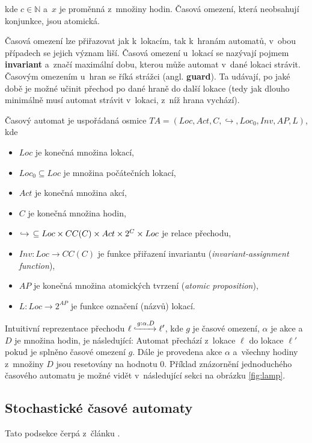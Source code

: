 kde $c \in \mathbb{N}$ a~$x$ je proměnná z~množiny hodin. Časová omezení, která neobsahují konjunkce, jsou atomická.

Časová omezení lze přiřazovat jak k~lokacím, tak k~hranám automatů, v~obou případech se jejich význam liší. Časová omezení u~lokací se nazývají pojmem \textbf{invariant} a~značí maximální dobu, kterou může automat v~dané lokaci strávit. Časovým omezením u~hran se říká strážci (angl. \textbf{guard}). Ta udávají, po jaké době je možné učinit přechod po dané hraně do další lokace (tedy jak dlouho minimálně musí automat strávit v~lokaci, z~níž hrana vychází).

\bigskip

Časový automat je uspořádaná osmice $TA = (Loc, Act, C, \hookrightarrow, Loc_0, Inv, AP, L)$, kde

\begin{itemize}
    \item $Loc$ je konečná množina lokací,
    \item $Loc_0 \subseteq Loc$ je množina počátečních lokací,
    \item $Act$ je konečná množina akcí,
    \item $C$ je konečná množina hodin,
    \item $\hookrightarrow \hspace{0.15cm} \subseteq Loc \times CC(C) \times Act \times 2^C \times Loc$ je relace přechodu,
    \item $Inv: Loc \rightarrow CC(C)$ je funkce přiřazení invariantu (\textit{invariant-assignment function}),
    \item $AP$ je konečná množina atomických tvrzení (\textit{atomic proposition}),
    \item $L: Loc \rightarrow 2^{AP}$ je funkce označení (názvů) lokací.
\end{itemize}

Intuitivní reprezentace přechodu $\ell \xhookrightarrow{g:\alpha,D} \ell'$, kde $g$ je časové omezení, $\alpha$ je akce a~$D$ je množina hodin, je následující: Automat přechází z~lokace $\ell$ do lokace $\ell'$ pokud je splněno časové omezení $g$. Dále je provedena akce $\alpha$ a~všechny hodiny z~množiny $D$ jsou resetovány na hodnotu 0. Příklad znázornění jednoduchého časového automatu je možné vidět v~následující sekci na obrázku \ref{fig:lamp}.

\subsection{Stochastické časové automaty} \label{stochastic_ta}
Tato podsekce čerpá z~článku \cite{uppaal_smc}.

